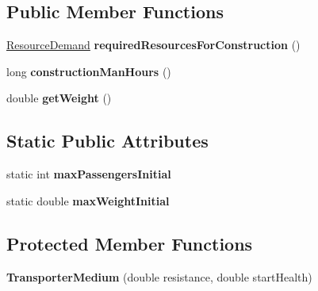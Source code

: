 \subsection*{Public Member Functions}
\begin{DoxyCompactItemize}
\item 
\hyperlink{classuniverse_1_1_resource_demand}{Resource\+Demand} {\bfseries required\+Resources\+For\+Construction} ()\hypertarget{classtools_1_1vehicles_1_1sea_1_1_transporter_medium_a0a637cbbce116129669211dee0a05279}{}\label{classtools_1_1vehicles_1_1sea_1_1_transporter_medium_a0a637cbbce116129669211dee0a05279}

\item 
long {\bfseries construction\+Man\+Hours} ()\hypertarget{classtools_1_1vehicles_1_1sea_1_1_transporter_medium_a438f5ce361b5cb8b04cb751de27f236a}{}\label{classtools_1_1vehicles_1_1sea_1_1_transporter_medium_a438f5ce361b5cb8b04cb751de27f236a}

\item 
double {\bfseries get\+Weight} ()\hypertarget{classtools_1_1vehicles_1_1sea_1_1_transporter_medium_a6325e8be6473b2a269f0499903bdd06e}{}\label{classtools_1_1vehicles_1_1sea_1_1_transporter_medium_a6325e8be6473b2a269f0499903bdd06e}

\end{DoxyCompactItemize}
\subsection*{Static Public Attributes}
\begin{DoxyCompactItemize}
\item 
static int {\bfseries max\+Passengers\+Initial}\hypertarget{classtools_1_1vehicles_1_1sea_1_1_transporter_medium_a5a006be6fbc4a48a5f8f92bf746f92c9}{}\label{classtools_1_1vehicles_1_1sea_1_1_transporter_medium_a5a006be6fbc4a48a5f8f92bf746f92c9}

\item 
static double {\bfseries max\+Weight\+Initial}\hypertarget{classtools_1_1vehicles_1_1sea_1_1_transporter_medium_a2c2d06d4eba5e1ba21e4621772eed23e}{}\label{classtools_1_1vehicles_1_1sea_1_1_transporter_medium_a2c2d06d4eba5e1ba21e4621772eed23e}

\end{DoxyCompactItemize}
\subsection*{Protected Member Functions}
\begin{DoxyCompactItemize}
\item 
{\bfseries Transporter\+Medium} (double resistance, double start\+Health)\hypertarget{classtools_1_1vehicles_1_1sea_1_1_transporter_medium_a126f8e091824fed3d692db3cb0907171}{}\label{classtools_1_1vehicles_1_1sea_1_1_transporter_medium_a126f8e091824fed3d692db3cb0907171}

\end{DoxyCompactItemize}
